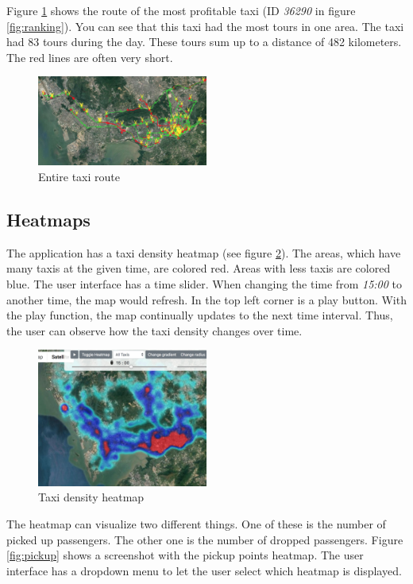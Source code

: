 \documentclass[10pt]{sig-alternate}
\begin{document}
Figure \ref{fig:best_taxi} shows the route of the most profitable taxi (ID \textit{36290} in figure \ref{fig:ranking}). You can see that this taxi had the most tours in one area. The taxi had 83 tours during the day. These tours sum up to a distance of 482 kilometers. The red lines are often very short.

\begin{figure}[ht]
\centering
\includegraphics[width=0.5\textwidth]{img/best_taxi.png}
\caption{Entire taxi route}
\label{fig:best_taxi}
\end{figure}

\subsection{Heatmaps}
\label{sec:heatmaps}

The application has a taxi density heatmap (see figure \ref{fig:density}). The areas, which have many taxis at the given time, are colored red. Areas with less taxis are colored blue. The user interface has a time slider. When changing the time from \textit{15:00} to another time, the map would refresh. In the top left corner is a play button. With the play function, the map continually updates to the next time interval. Thus, the user can observe how the taxi density changes over time.

\begin{figure}[ht]
\centering
\includegraphics[width=0.5\textwidth]{img/density.png}
\caption{Taxi density heatmap}
\label{fig:density}
\end{figure}

The heatmap can visualize two different things. One of these is the number of picked up passengers. The other one is the number of dropped passengers. Figure \ref{fig:pickup} shows a screenshot with the pickup points heatmap. The user interface has a dropdown menu to let the user select which heatmap is displayed.
\end{document}
